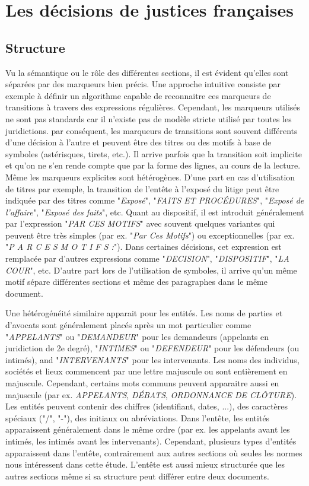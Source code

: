 \section{Les décisions de justices françaises}
\label{sec:structuration:probleme}
\subsection{Structure}
Vu la sémantique ou le rôle des différentes sections, il est évident qu'elles sont séparées par des marqueurs bien précis. Une approche intuitive consiste par exemple à définir un algorithme capable de reconnaitre ces marqueurs de transitions à travers des expressions régulières. Cependant, les marqueurs utilisés ne sont pas standards car il n'existe pas de modèle stricte utilisé par toutes les juridictions. par conséquent, les marqueurs de transitions sont souvent différents d'une décision à l'autre et peuvent être des titres ou des motifs à base de symboles (astérisques, tirets, etc.). Il arrive parfois que la transition soit implicite et qu'on ne s'en rende compte que par la forme des lignes, au cours de la lecture. Même les marqueurs explicites sont hétérogènes. D'une part en cas d'utilisation de titres par exemple, la transition de l'entête à l'exposé du litige peut être indiquée par des titres comme "\textit{Exposé}", "\textit{FAITS ET PROCÉDURES}", "\textit{Exposé de l’affaire}", "\textit{Exposé des faits}", etc. Quant au dispositif, il est introduit généralement par l'expression "\textit{PAR CES MOTIFS}" avec souvent quelques variantes qui peuvent être très simples (par ex. "\textit{Par Ces Motifs}") ou exceptionnelles (par ex. "\textit{P A R C E S M O T I F S :}"). Dans certaines décisions, cet expression est remplacée par d'autres expressions comme "\textit{DECISION}", "\textit{DISPOSITIF}", "\textit{LA COUR}", etc. 
D'autre part lors de l'utilisation de symboles, il arrive qu'un même motif sépare différentes sections et même des paragraphes dans le même document.

Une hétérogénéité similaire apparait pour les entités. Les noms de parties et d'avocats sont généralement placés après un mot particulier comme  "\textit{APPELANTS}" ou "\textit{DEMANDEUR}" pour les demandeurs (appelants en juridiction de 2e degré), "\textit{INTIMES}" ou "\textit{DEFENDEUR}" pour les défendeurs (ou intimés), and "\textit{INTERVENANTS}" pour les intervenants. Les noms des individus, sociétés et lieux commencent par une lettre majuscule ou sont entièrement en majuscule. Cependant, certains mots communs peuvent apparaitre aussi en majuscule (par ex. \textit{APPELANTS}, \textit{DÉBATS}, \textit{ORDONNANCE DE CLÔTURE}). Les entités peuvent contenir des chiffres (identifiant, dates, ...), des caractères spéciaux ("/", "-"), des initiaux ou abréviations.  Dans l'entête, les entités apparaissent généralement dans le même ordre (par ex. les appelants avant les intimés, les intimés avant les intervenants). Cependant, plusieurs types d'entités apparaissent dans l'entête, contrairement aux autres sections où seules les normes nous intéressent dans cette étude. L'entête est aussi mieux structurée que les autres sections même si sa structure peut différer entre deux documents.

